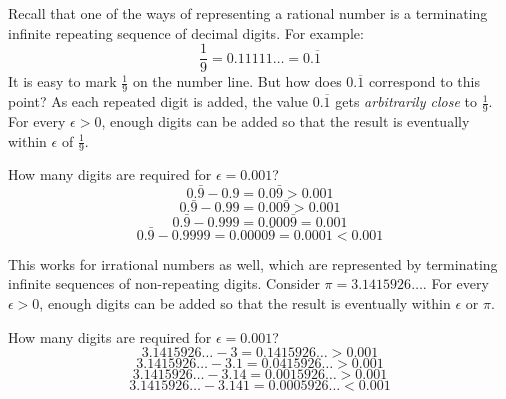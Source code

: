 \documentclass[letterpaper,12pt,fleqn]{article}
\newcommand{\e}{\epsilon}
\begin{document}
\begin{example}
  Recall that one of the ways of representing a rational number is a terminating infinite repeating sequence of
  decimal digits.  For example:
  \[\frac{1}{9}=0.11111\ldots=0.\overline{1}\]
  It is easy to mark \(\frac{1}{9}\) on the number line.  But how does \(0.\overline{1}\) correspond to this point?
  As each repeated digit is added, the value \(0.\overline{1}\) gets \emph{arbitrarily close} to \(\frac{1}{9}\).
  For every \(\e>0\), enough digits can be added so that the result is eventually within \(\e\) of \(\frac{1}{9}\).

  \bigskip

  \begin{center}
  \end{center}

  How many digits are required for \(\e=0.001\)?
  \[0.\bar{9}-0.9=0.0\bar{9}>0.001\]
  \[0.\bar{9}-0.99=0.00\bar{9}>0.001\]
  \[0.\bar{9}-0.999=0.000\bar{9}=0.001\]
  \[0.\bar{9}-0.9999=0.0000\bar{9}=0.0001<0.001\]
\end{example}

\begin{example}
  This works for irrational numbers as well, which are represented by terminating infinite sequences of
  non-repeating digits.  Consider \(\pi=3.1415926\ldots\).  For every \(\e>0\), enough digits can be added so that
  the result is eventually within \(\e\) or \(\pi\).

  \bigskip

  \begin{center}
  \end{center}

  How many digits are required for \(\e=0.001\)?
  \[3.1415926\ldots-3=0.1415926\ldots>0.001\]
  \[3.1415926\ldots-3.1=0.0415926\ldots>0.001\]
  \[3.1415926\ldots-3.14=0.0015926\ldots>0.001\]
  \[3.1415926\ldots-3.141=0.0005926\ldots<0.001\]
\end{example}
\end{document}
